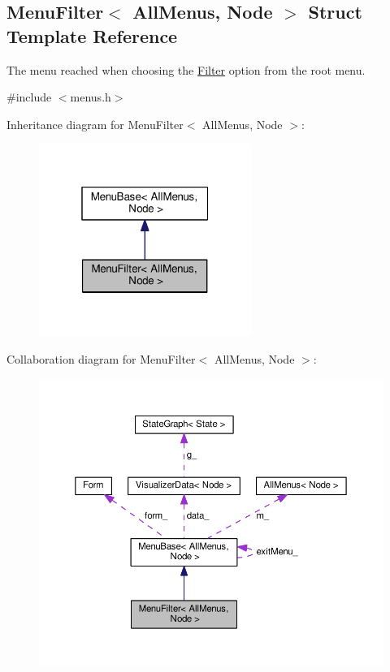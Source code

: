 \hypertarget{structMenuFilter}{}\subsection{Menu\+Filter$<$ All\+Menus, Node $>$ Struct Template Reference}
\label{structMenuFilter}


The menu reached when choosing the \hyperlink{structFilter}{Filter} option from the root menu.  




{\ttfamily \#include $<$menus.\+h$>$}



Inheritance diagram for Menu\+Filter$<$ All\+Menus, Node $>$\+:\nopagebreak
\begin{figure}[H]
\begin{center}
\leavevmode
\includegraphics[width=196pt]{structMenuFilter__inherit__graph}
\end{center}
\end{figure}


Collaboration diagram for Menu\+Filter$<$ All\+Menus, Node $>$\+:\nopagebreak
\begin{figure}[H]
\begin{center}
\leavevmode
\includegraphics[width=350pt]{structMenuFilter__coll__graph}
\end{center}
\end{figure}
